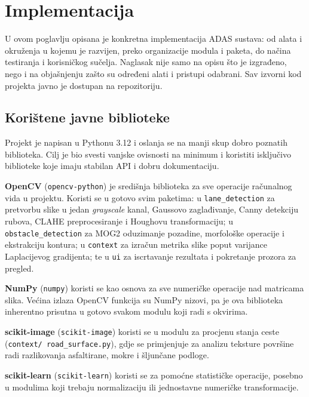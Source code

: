 
\chapter{Implementacija}

U ovom poglavlju opisana je konkretna implementacija ADAS sustava: od alata i okruženja u kojemu je razvijen, preko organizacije modula i paketa, do načina testiranja i korisničkog sučelja. Naglasak nije samo na opisu što je izgrađeno, nego i na objašnjenju zašto su određeni alati i pristupi odabrani. Sav izvorni kod projekta javno je dostupan na repozitoriju\supercite{adasgithub}.

\section{Korištene javne biblioteke}

Projekt je napisan u Pythonu 3.12 i oslanja se na manji skup dobro poznatih biblioteka. Cilj je bio svesti vanjske ovisnosti na minimum i koristiti isključivo biblioteke koje imaju stabilan API i dobru dokumentaciju.

\textbf{OpenCV}\supercite{opencv} (\texttt{opencv-python}) je središnja biblioteka za sve operacije računalnog vida u projektu. Koristi se u gotovo svim paketima: u \texttt{lane\_detection} za pretvorbu slike u jedan \textit{grayscale} kanal, Gaussovo zaglađivanje, Canny detekciju rubova, CLAHE preprocesiranje i Houghovu transformaciju; u \texttt{obstacle\_detection} za MOG2 oduzimanje pozadine, morfološke operacije i ekstrakciju kontura; u \texttt{context} za izračun metrika slike poput varijance Laplacijevog gradijenta; te u \texttt{ui} za iscrtavanje rezultata i pokretanje prozora za pregled.

\textbf{NumPy} (\texttt{numpy}) koristi se kao osnova za sve numeričke operacije nad matricama slika. Većina izlaza OpenCV funkcija su NumPy nizovi, pa je ova biblioteka inherentno prisutna u gotovo svakom modulu koji radi s okvirima.

\textbf{scikit-image} (\texttt{scikit-image}) koristi se u modulu za procjenu stanja ceste (\texttt{context/ road\_surface.py}), gdje se primjenjuje za analizu teksture površine radi razlikovanja asfaltirane, mokre i šljunčane podloge.

\textbf{scikit-learn} (\texttt{scikit-learn}) koristi se za pomoćne statističke operacije, posebno u modulima koji trebaju normalizaciju ili jednostavne numeričke transformacije.


